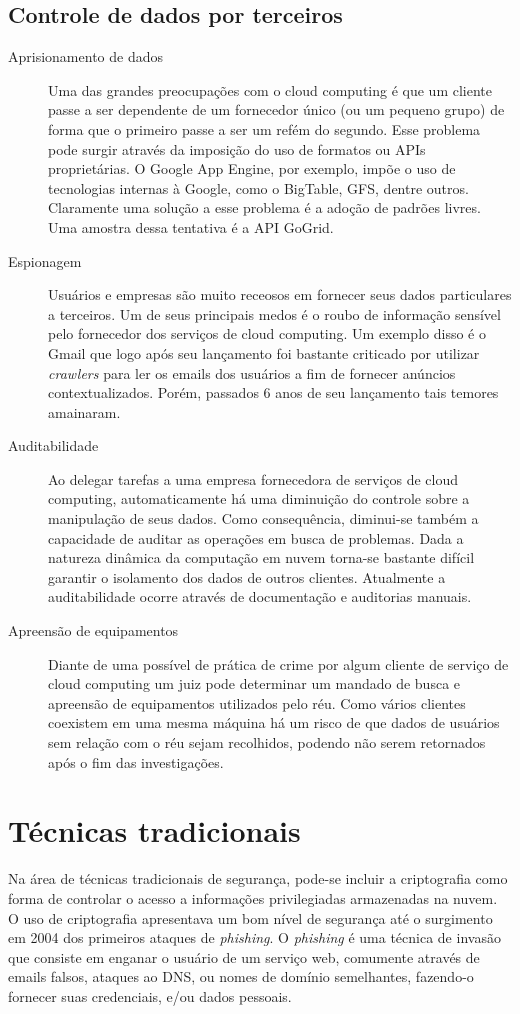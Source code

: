 \documentclass[brazil,12pt]{article}
\begin{document}
\subsection{Controle de dados por terceiros}
\begin{description}
  \item[Aprisionamento de dados] Uma das grandes preocupações com o cloud
  computing é que um cliente passe a ser dependente de um fornecedor único (ou
  um pequeno grupo) de forma que o primeiro passe a ser um refém do segundo.
  Esse problema pode surgir através da imposição do uso de formatos ou APIs
  proprietárias. O Google App Engine, por exemplo, impõe o uso de tecnologias
  internas à Google, como o BigTable, GFS, dentre outros. Claramente uma solução
  a esse problema é a adoção de padrões livres. Uma amostra dessa tentativa é a
  API GoGrid.
  \item[Espionagem] Usuários e empresas são muito receosos em fornecer seus
  dados particulares a terceiros. Um de seus principais medos é o roubo de
  informação sensível pelo fornecedor dos serviços de cloud computing. Um
  exemplo disso é o Gmail que logo após seu lançamento foi bastante criticado
  por utilizar \emph{crawlers} para ler os emails dos usuários a fim de fornecer
  anúncios contextualizados. Porém, passados 6 anos de seu lançamento tais
  temores amainaram.
  \item[Auditabilidade] Ao delegar tarefas a uma empresa fornecedora de serviços
  de cloud computing, automaticamente há uma diminuição do controle sobre a
  manipulação de seus dados. Como consequência, diminui-se também a capacidade
  de auditar as operações em busca de problemas. Dada a natureza dinâmica da
  computação em nuvem torna-se bastante difícil garantir o isolamento dos dados
  de outros clientes. Atualmente a auditabilidade ocorre através de documentação
  e auditorias manuais. \cite{controlling-data-in-cloud}
  \item[Apreensão de equipamentos] Diante de uma possível de prática de crime
  por algum cliente de serviço de cloud computing um juiz pode determinar um
  mandado de busca e apreensão de equipamentos utilizados pelo réu. Como vários
  clientes coexistem em uma mesma máquina há um risco de que dados de usuários
  sem relação com o réu sejam recolhidos, podendo não serem retornados após o
  fim das investigações.
\end{description}

\section{Técnicas tradicionais}
Na área de técnicas tradicionais de segurança, pode-se incluir a criptografia
como forma de controlar o acesso a informações privilegiadas armazenadas na
nuvem. O uso de criptografia apresentava um bom nível de segurança até o
surgimento em 2004 dos primeiros ataques de \emph{phishing}. O \emph{phishing} é
uma técnica de invasão que consiste em enganar o usuário de um serviço web,
comumente através de emails falsos, ataques ao DNS, ou nomes de domínio
semelhantes, fazendo-o fornecer suas credenciais, e/ou dados pessoais.
\cite{technical-security-issues}
\end{document}
